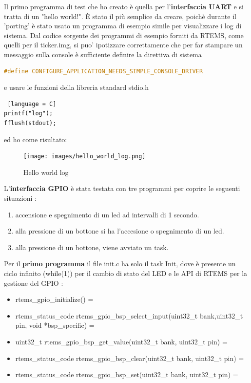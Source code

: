 \documentclass[12pt, a4paper, titlepage, oneside]{book}
\begin{document}
\begin{flushleft}
\begin{lstlisting}[language = C]
\end{lstlisting}
\newpage
Il primo programma di test che ho creato è quella per l'\textbf{interfaccia UART} e si tratta di un "hello world!". È stato il più semplice da creare, poichè durante il 'porting' è stato usato un programma di esempio simile per visualizzare i log di sistema. Dal codice sorgente dei programmi di esempio forniti da RTEMS, come quelli per il ticker.img,  si puo' ipotizzare correttamente che per far stampare un messaggio sulla console è sufficiente definire la direttiva di sistema 
\begin{lstlisting}[language = C]
#define CONFIGURE_APPLICATION_NEEDS_SIMPLE_CONSOLE_DRIVER 
\end{lstlisting} 
e usare le funzioni della libreria standard stdio.h 
\begin{lstlisting} [language = C]
printf("log"); 
fflush(stdout);
\end{lstlisting}
ed ho come risultato:
\begin{figure}[h]
    \centering
    \texttt{[image: images/hello\_world\_log.png]}
    \caption{Hello world log}
    \label{fig:hello_world_log}
\end{figure}
\newpage
L'\textbf{interfaccia GPIO }è stata testata con tre programmi per coprire le seguenti situazioni :
\begin{enumerate}
    \item accensione e spegnimento di un led ad intervalli di 1 secondo.
    \item alla pressione di un bottone si ha l'accesione o spegnimento di un led.
    \item alla pressione di un bottone, viene avviato un task.
\end{enumerate}
Per il \textbf{primo programma} il file init.c ha solo il task Init, dove è presente un ciclo infinito (while(1)) per il cambio di stato del LED e le API di RTEMS per la gestione del GPIO :
\begin{itemize}
    \item rtems\_gpio\_initialize() = 
    \item rtems\_status\_code rtems\_gpio\_bsp\_select\_input(uint32\_t bank,uint32\_t pin,  void *bsp\_specific) =
    \item uint32\_t rtems\_gpio\_bsp\_get\_value(uint32\_t bank, uint32\_t pin) =
    \item rtems\_status\_code rtems\_gpio\_bsp\_clear(uint32\_t bank, uint32\_t pin) =
    \item rtems\_status\_code rtems\_gpio\_bsp\_set(uint32\_t bank, uint32\_t pin) =

\end{itemize}
\end{flushleft}
\end{document}
